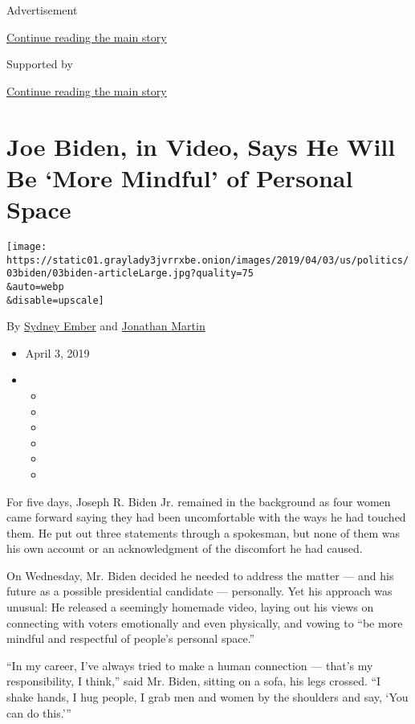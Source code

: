 Advertisement

\protect\hyperlink{after-top}{Continue reading the main story}

Supported by

\protect\hyperlink{after-sponsor}{Continue reading the main story}

\hypertarget{joe-biden-in-video-says-he-will-be-more-mindful-of-personal-space}{%
\section{Joe Biden, in Video, Says He Will Be `More Mindful' of Personal
Space}\label{joe-biden-in-video-says-he-will-be-more-mindful-of-personal-space}}

\texttt{[image: https://static01.graylady3jvrrxbe.onion/images/2019/04/03/us/politics/03biden/03biden-articleLarge.jpg?quality=75\\\&auto=webp\\\&disable=upscale]}

By \href{https://www.nytimes3xbfgragh.onion/by/sydney-ember}{Sydney
Ember} and
\href{https://www.nytimes3xbfgragh.onion/by/jonathan-martin}{Jonathan
Martin}

\begin{itemize}
\item
  April 3, 2019
\item
  \begin{itemize}
  \item
  \item
  \item
  \item
  \item
  \item
  \end{itemize}
\end{itemize}

For five days, Joseph R. Biden Jr. remained in the background as four
women came forward saying they had been uncomfortable with the ways he
had touched them. He put out three statements through a spokesman, but
none of them was his own account or an acknowledgment of the discomfort
he had caused.

On Wednesday, Mr. Biden decided he needed to address the matter --- and
his future as a possible presidential candidate --- personally. Yet his
approach was unusual: He released a seemingly homemade video, laying out
his views on connecting with voters emotionally and even physically, and
vowing to ``be more mindful and respectful of people's personal space.''

``In my career, I've always tried to make a human connection --- that's
my responsibility, I think,'' said Mr. Biden, sitting on a sofa, his
legs crossed. ``I shake hands, I hug people, I grab men and women by the
shoulders and say, `You can do this.'''

